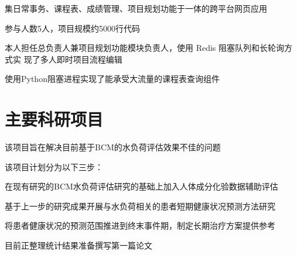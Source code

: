 \documentclass[]{deedy-resume-openfont}
\begin{document}
\begin{minipage}[t]{0.73\textwidth}
	\begin{tightemize}
		\item 集日常事务、课程表、成绩管理、项目规划功能于一体的跨平台网页应用
		\item 参与人数5人，项目规模约5000行代码
		\item 本人担任总负责人兼项目规划功能模块负责人，使用 Redis 阻塞队列和长轮询方式实 现了多人即时项目流程编辑
		\item 使用Python阻塞进程实现了能承受大流量的课程表查询组件
	\end{tightemize}
	\sectionsep

	

	\section{主要科研项目}
	\descript{}
    \begin{tightemize}
        \item 该项目旨在解决目前基于BCM的水负荷评估效果不佳的问题
        \item 该项目计划分为以下三步：
        \vspace{\topsep}
        \begin{tightemize}
            \item 在现有研究的BCM水负荷评估研究的基础上加入人体成分化验数据辅助评估
            \item 基于上一步的研究成果开展与水负荷相关的患者短期健康状况预测方法研究
            \item 将患者健康状况的预测范围推进到终末事件期，制定长期治疗方案提供参考
        \end{tightemize}
        \vspace{\topsep}
		\item 目前正整理统计结果准备撰写第一篇论文
	\end{tightemize}
    \sectionsep



\end{minipage}
\end{document}

